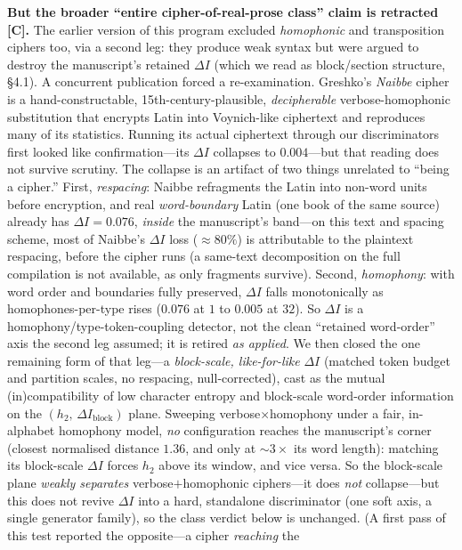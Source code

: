 \documentclass[11pt]{article}
\newcommand{\grade}[1]{{\small\textbf{[#1]}}}
\begin{document}
\textbf{But the broader ``entire cipher-of-real-prose class'' claim is retracted \grade{C}.}
The earlier version of this program excluded \emph{homophonic} and transposition ciphers too,
via a second leg: they produce weak syntax but were argued to destroy the manuscript's
retained $\Delta I$ (which we read as block/section structure, \S4.1). A concurrent
publication forced a re-examination. Greshko's \emph{Naibbe} cipher \citep{greshko2025naibbe}
is a hand-constructable, 15th-century-plausible, \emph{decipherable} verbose-homophonic
substitution that encrypts Latin into Voynich-like ciphertext and reproduces many of its
statistics. Running its actual ciphertext through our discriminators first looked like
confirmation---its $\Delta I$ collapses to $0.004$---but that reading does not survive scrutiny.
The collapse is an artifact of two things unrelated to ``being a cipher.'' First,
\emph{respacing}: Naibbe refragments the Latin into non-word units before encryption, and
real \emph{word-boundary} Latin (one book of the same source) already has $\Delta I=0.076$,
\emph{inside} the manuscript's band---on this text and spacing scheme, most of Naibbe's
$\Delta I$ loss ($\approx\!80\%$) is attributable to the plaintext respacing, before the cipher
runs (a same-text decomposition on the full compilation is not available, as only fragments
survive). Second, \emph{homophony}: with word order and boundaries fully preserved, $\Delta I$
falls monotonically as homophones-per-type rises ($0.076$ at $1$ to $0.005$ at $32$). So
$\Delta I$ is a homophony/type-token-coupling detector, not the clean ``retained word-order''
axis the second leg assumed; it is retired \emph{as applied}. We then closed the one remaining
form of that leg---a \emph{block-scale, like-for-like} $\Delta I$ (matched token budget and
partition scales, no respacing, null-corrected), cast as the mutual (in)compatibility of low
character entropy and block-scale word-order information on the $(h_2,\,\Delta I_{\text{block}})$
plane. Sweeping verbose$\times$homophony under a fair, in-alphabet homophony model, \emph{no}
configuration reaches the manuscript's corner (closest normalised distance $1.36$, and only at
$\sim\!3\times$ its word length): matching its block-scale $\Delta I$ forces $h_2$ above its
window, and vice versa. So the block-scale plane \emph{weakly separates} verbose$+$homophonic
ciphers---it does \emph{not} collapse---but this does not revive $\Delta I$ into a hard,
standalone discriminator (one soft axis, a single generator family), so the class verdict below
is unchanged. (A first pass of this test reported the opposite---a cipher \emph{reaching} the
\end{document}
